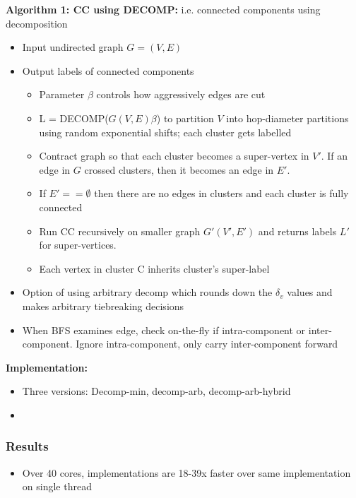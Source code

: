 \textbf{Algorithm 1: CC using DECOMP: }
i.e. connected components using decomposition

\begin{itemize}
    \item Input undirected graph $G = (V,E)$
    \item Output labels of connected components
    \begin{itemize}
        \item Parameter $\beta$ controls how aggressively edges are cut
        \item L = DECOMP($G(V,E)\beta$) to partition $V$ into hop-diameter partitions using random exponential shifts; each cluster gets labelled
        \item Contract graph so that each cluster becomes a super-vertex in $V'$. If an edge in $G$ crossed clusters, then it becomes an edge in $E'$. 
        \item If $E' == \emptyset$ then there are no edges in clusters and each cluster is fully connected
        \item Run CC recursively on smaller graph $G'(V',E')$ and returns labels $L'$ for super-vertices. 
        \item Each vertex in cluster C inherits cluster's super-label
    \end{itemize}
    \item Option of using arbitrary decomp which rounds down the $\delta_v$ values and makes arbitrary tiebreaking decisions
    \item When BFS examines edge, check on-the-fly if intra-component or inter-component. Ignore intra-component, only carry inter-component forward
\end{itemize}

\textbf{Implementation: }
\begin{itemize}
    \item Three versions: Decomp-min, decomp-arb, decomp-arb-hybrid
    \item 
\end{itemize}

\subsubsection{Results}

\begin{itemize}
    \item Over 40 cores, implementations are 18-39x faster over same implementation on single thread
\end{itemize}

